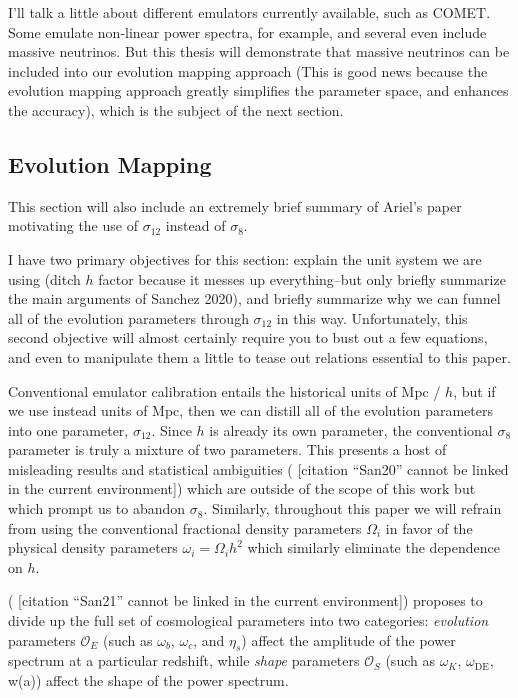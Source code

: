 \documentclass[11pt]{article}
\newcommand{\cbib}[1]
{\IfFileExists{biblatex.sty}
{\cite{#1}}
{[citation ``#1'' cannot be linked in the current environment]}}
\begin{document}
I'll talk a little about different emulators currently available, such as COMET. Some emulate non-linear power spectra, for example, and several even include massive neutrinos. But this thesis will demonstrate that massive neutrinos can be included into our evolution mapping approach (This is good news because the evolution mapping approach greatly simplifies the parameter space, and enhances the accuracy), which is the subject of the next section.

\begin{centering}
\subsection{Evolution Mapping}
\end{centering}

This section will also include an extremely brief summary of Ariel's paper motivating the use of $\sigma_{12}$ instead of $\sigma_8$.

    I have two primary objectives for this section: explain the unit system
    we are using (ditch $h$ factor because it messes up everything--but
    only briefly summarize the main arguments of Sanchez 2020), and briefly
    summarize why we can funnel all of the evolution parameters through
    $\sigma_{12}$ in this way. Unfortunately, this second objective will
    almost certainly require you to bust out a few equations, and even to
    manipulate them a little to tease out relations essential to this paper.

Conventional emulator calibration entails the historical units of Mpc / $h$,
but if we use instead units of Mpc, then we can distill all of the evolution
parameters into one parameter, $\sigma_{12}$. Since $h$ is already its own parameter, the conventional $\sigma_8$ parameter is truly a mixture
of two parameters. This presents a host of misleading results  and statistical
ambiguities (\cbib{San20}) which are outside of the scope of this work but
which prompt us to abandon $\sigma_8$.
Similarly, throughout this paper we will refrain from using the conventional
fractional density parameters $\Omega_i$ in favor of the physical density
parameters $\omega_i = \Omega_i h^2$ which similarly eliminate the
dependence on $h$.

(\cbib{San21}) proposes to divide up the full set of cosmological
parameters into two categories: \textit{evolution} parameters $\mathcal{O}_E$
(such as $\omega_b$, $\omega_c$, and $\eta_s$)
affect the amplitude of the power spectrum at a particular redshift, while
\textit{shape} parameters $\mathcal{O}_S$
(such as $\omega_K$, $\omega_\text{DE}$, w(a))
affect the shape of the power
spectrum.
\end{document}
